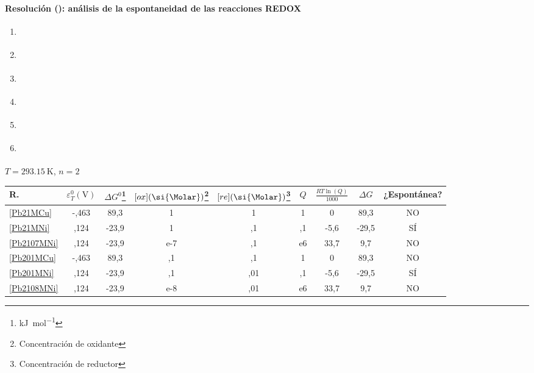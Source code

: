 \begin{frame}
	\frametitle{\ejerciciocmd}
	\framesubtitle{Resolución (): análisis de la espontaneidad de las reacciones REDOX}
	\begin{enumerate}[label={\alph*)},font={\color{red!50!black}\bfseries}]
		\item\label{Pb21MCu}  
		\item\label{Pb21MNi}  
		\item\label{Pb2107MNi}
		\item\label{Pb201MCu} 
		\item\label{Pb201MNi} 
		\item\label{Pb2108MNi}
	\end{enumerate}
	 $T=\SI{293,15}{\kelvin}$, $n=2$
	\begin{center}
		\begin{tabular}{lSSSSSSSc}
			\toprule
				R. &
			    {$\varepsilon^0_T(\si{\volt})$} &
			    {$\Delta G^0$\footnote[1]{\si{\kilo\joule\per\mol}}} &
			    {$[ox](\si{\Molar})$\footnote[2]{Concentración de oxidante}} &
			    {$[re](\si{\Molar})$\footnote[3]{Concentración de reductor}} &
			    {$Q$} &
			    {$\frac{RT\ln(Q)}{1000}$} &
			    {$\Delta G$\footnotemark[1]} &
			    {\footnotesize ¿Espontánea?} \\
			\midrule
				\ref{Pb21MCu}   & -,463 &  89,3 & 1   & 1    & 1   &     0    &  89,3 & NO \\
				\ref{Pb21MNi}   &  ,124 & -23,9 & 1   &  ,1  &  ,1 &    -5,6  & -29,5 & SÍ \\
				\ref{Pb2107MNi} &  ,124 & -23,9 & e-7 &  ,1  &  e6 &    33,7  &   9,7 & NO \\
				\ref{Pb201MCu}  & -,463 &  89,3 &  ,1 &  ,1  & 1   &     0    &  89,3 & NO \\
				\ref{Pb201MNi}  &  ,124 & -23,9 &  ,1 &  ,01 &  ,1 &    -5,6  & -29,5 & SÍ \\
				\ref{Pb2108MNi} &  ,124 & -23,9 & e-8 &  ,01 & e6  &    33,7  &   9,7 & NO \\
			\bottomrule
		\end{tabular}
	\end{center}
\end{frame}
